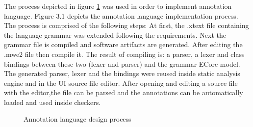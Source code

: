 The process depicted in figure \ref{figure:Language_Design_Process} was used in order to
implement annotation language. Figure 3.1 depicts the
annotation language implementation process. The process is
comprised of the following steps: At first, the .xtext file
containing the language grammar was extended following the requirements. Next the grammar file is compiled and software artifacts are generated. After editing the .mwe2 file then compile it. The result of compiling is: a parser, a lexer and class bindings between these two (lexer and parser) and the grammar ECore model. The generated parser, lexer and the bindings were reused inside static analysis engine and in the UI source file editor. After opening and editing a source file with the editor,the file can be parsed and the annotations can be automatically loaded and used inside checkers.
\begin{figure}[htbp]
	\centering
	\caption{Annotation language design process}
	\label{figure:Language_Design_Process}
\end{figure}